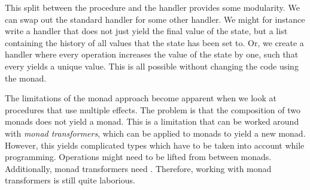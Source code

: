 This split between the procedure and the handler provides some modularity. We can swap out the standard  handler for some other handler. We might for instance write a handler that does not just yield the final value of the state, but a list containing the history of all values that the state has been set to. Or, we create a handler where every  operation increases the value of the state by one, such that every  yields a unique value. This is all possible without changing the code using the  monad.

The limitations of the monad approach become apparent when we look at procedures that use multiple effects. The problem is that the composition of two monads does not yield a monad. This is a limitation that can be worked around with \emph{monad transformers}, which can be applied to monads to yield a new monad. However, this yields complicated types which have to be taken into account while programming. Operations might need to be lifted from between monads. Additionally, monad transformers need . Therefore, working with monad transformers is still quite laborious.



